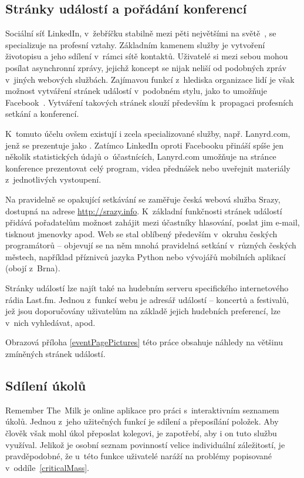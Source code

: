 \documentclass[12pt,oneside,final]{fithesis2}
\begin{document}
\subsection{Stránky událostí a pořádání konferencí}
Sociální síť LinkedIn, v~žebříčku stabilně mezi pěti největšími na světě~\cite{kazeniac2009social}, se specializuje na profesní vztahy. Základním kamenem služby je vytvoření životopisu a jeho sdílení v~rámci sítě kontaktů. Uživatelé si mezi sebou mohou posílat asynchronní zprávy, jejichž koncept se nijak neliší od podobných zpráv v~jiných webových službách. Zajímavou funkcí z~hlediska organizace lidí je však možnost vytváření stránek událostí v~podobném stylu, jako to umožňuje Facebook~\cite{linkedin2011networking}. Vytváření takových stránek slouží především k~propagaci profesních setkání a konferencí.

K~tomuto účelu ovšem existují i zcela specializované služby, např. Lanyrd.com, jenž se prezentuje jako . Zatímco LinkedIn oproti Facebooku přináší spíše jen několik statistických údajů o~účastnících, Lanyrd.com umožňuje na stránce konference prezentovat celý program, videa přednášek nebo uveřejnit materiály z~jednotlivých vystoupení.

Na pravidelně se opakující setkávání se zaměřuje česká webová služba Srazy, dostupná na adrese \url{http://srazy.info}. K~základní funkčnosti stránek událostí přidává pořadatelům možnost zahájit mezi účastníky hlasování, poslat jim e-mail, tisknout jmenovky apod. Web se stal oblíbený především v~okruhu českých programátorů -- objevují se na něm mnohá pravidelná setkání v~různých českých městech, například příznivců jazyka Python nebo vývojářů mobilních aplikací (obojí z~Brna).

Stránky událostí lze najít také na hudebním serveru specifického internetového rádia Last.fm. Jednou z~funkcí webu je adresář událostí -- koncertů a festivalů, jež jsou doporučovány uživatelům na základě jejich hudebních preferencí, lze v~nich vyhledávat, apod.

Obrazová příloha \ref{eventPagePictures} této práce obsahuje náhledy na většinu zmíněných stránek událostí.

\subsection{Sdílení úkolů}
Remember The~Milk je online aplikace pro práci s~interaktivním seznamem úkolů. Jednou z~jeho užitečných funkcí je sdílení a přeposílání položek. Aby člověk však mohl úkol přeposlat kolegovi, je zapotřebí, aby i on tuto službu využíval. Jelikož je osobní seznam povinností velice individuální záležitostí, je pravděpodobné, že u~této funkce uživatelé naráží na problémy popisované v~oddíle~\ref{criticalMass}.
\end{document}

